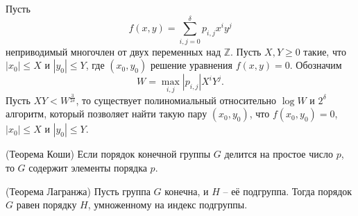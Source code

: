 \documentclass[_00_dissertation.tex]{subfiles}
\begin{document}
\begin{statement}\label{statement:coppersmith}
  Пусть
  \begin{equation*}
      f(x, y) = \sum\limits_{i, j = 0}^{\delta} p_{i, j} x^i y^j
  \end{equation*}
  неприводимый многочлен от двух переменных над $\mathbb{Z}$.
  Пусть $X, Y \ge 0$ такие, что $|x_0| \le X$ и $|y_0| \le Y$, где $(x_0, y_0)$ решение уравнения $f(x, y) = 0$.
  Обозначим
  \begin{equation*}
      W = \max_{i, j} |p_{i, j}| X^i Y^j.
  \end{equation*}
  Пусть $XY < W^{\frac{3}{2\delta}}$, то существует полиномиальный относительно $\log W$ и $2^\delta$ алгоритм, который позволяет найти такую пару $(x_0, y_0)$, что $f(x_0, y_0) = 0$, $|x_0| \le X$ и $|y_0| \le Y$.
\end{statement}

\begin{statement}\label{statement:cauchy}(Теорема Коши)
    Если порядок конечной группы $G$ делится на простое число $p$, то $G$ содержит элементы порядка $p$.
\end{statement}

\begin{statement}\label{statement:lagrange}(Теорема Лагранжа)
    Пусть группа $G$ конечна, и $H$ -- её подгруппа.
    Тогда порядок $G$ равен порядку $H$, умноженному на индекс подгруппы.
\end{statement}

\onlyinsubfile{
    
    
}
\end{document}
